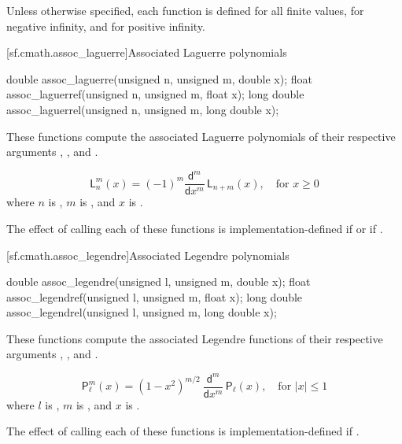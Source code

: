 \pnum
Unless otherwise specified,
each function is defined
for all finite values,
for negative infinity,
and for positive infinity.

[sf.cmath.assoc_laguerre]{Associated Laguerre polynomials}%
%
%
%
%
%
\begin{itemdecl}
double       assoc_laguerre(unsigned n, unsigned m, double x);
float        assoc_laguerref(unsigned n, unsigned m, float x);
long double  assoc_laguerrel(unsigned n, unsigned m, long double x);
\end{itemdecl}

\begin{itemdescr}
\pnum\effects
These functions compute
the associated Laguerre polynomials
of their respective arguments
, , and .

\pnum\returns
\[%
  \mathsf{L}_n^m(x) =
  (-1)^m \frac{\mathsf{d} ^ m}
	   {\mathsf{d}x ^ m} \, \mathsf{L}_{n+m}(x),
	   \quad \mbox{for $x \ge 0$}
\]
where
$n$ is ,
$m$ is , and
$x$ is .

\pnum\remark
The effect of calling each of these functions
is implementation-defined
if  or if .
\end{itemdescr}

[sf.cmath.assoc_legendre]{Associated Legendre polynomials}%
%
%
%
%
%
\begin{itemdecl}
double       assoc_legendre(unsigned l, unsigned m, double x);
float        assoc_legendref(unsigned l, unsigned m, float x);
long double  assoc_legendrel(unsigned l, unsigned m, long double x);
\end{itemdecl}

\begin{itemdescr}

\pnum\effects
These functions compute
the associated Legendre functions
of their respective arguments
, , and .

\pnum\returns
\[%
  \mathsf{P}_\ell^m(x) =
  (1 - x^2) ^ {m/2}
  \:
  \frac{ \mathsf{d} ^ m}
       { \mathsf{d}x ^ m} \, \mathsf{P}_\ell(x),
	   \quad \mbox{for $|x| \le 1$}
\]
where
$l$ is ,
$m$ is , and
$x$ is .

\pnum\remark
The effect of calling each of these functions
is implementation-defined
if .
\end{itemdescr}

